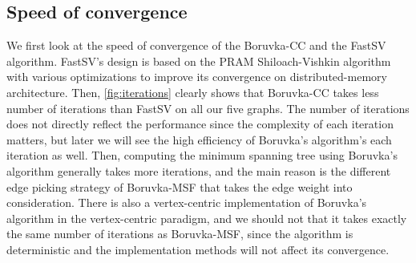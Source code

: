 \documentclass{sokendai_thesis} %
\newcommand{\boruvka}[0]{Boruvka}
\begin{document}

\subsection{Speed of convergence}

We first look at the speed of convergence of the \boruvka{}-CC and the FastSV algorithm.
FastSV's design is based on the PRAM Shiloach-Vishkin algorithm~\cite{ShVi82} with various optimizations to improve its convergence on distributed-memory architecture.
Then, \autoref{fig:iterations} clearly shows that \boruvka{}-CC takes less number of iterations than FastSV on all our five graphs.
The number of iterations does not directly reflect the performance since the complexity of each iteration matters, but later we will see the high efficiency of \boruvka{}'s algorithm's each iteration as well.
Then, computing the minimum spanning tree using \boruvka{}'s algorithm generally takes more iterations, and the main reason is the different edge picking strategy of \boruvka{}-MSF that takes the edge weight into consideration.
There is also a vertex-centric implementation of \boruvka{}'s algorithm in the vertex-centric paradigm, and we should not that it takes exactly the same number of iterations as \boruvka{}-MSF, since the algorithm is deterministic and the implementation methods will not affect its convergence.

\end{document}
